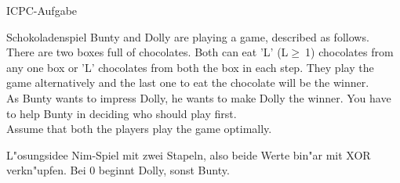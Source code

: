 \documentclass[18pt]{beamer}
\begin{document}
\begin{frame}{ICPC-Aufgabe}
\begin{exampleblock}{Schokoladenspiel}
Bunty and Dolly are playing a game, described as follows.\\
There are two boxes full of chocolates. Both can eat 'L' (L$\geq\ $1) chocolates from any one box or 'L' chocolates from both the box in each step. They play the game alternatively and the last one to eat the chocolate will be the winner.\\
As Bunty wants to impress Dolly, he wants to make Dolly the winner. You have to help Bunty in deciding who should play first.\\
Assume that both the players play the game optimally.
\end{exampleblock}
\pause
\begin{block}{L"osungsidee}
Nim-Spiel mit zwei Stapeln, also beide Werte bin"ar mit XOR verkn"upfen.
Bei 0 beginnt Dolly, sonst Bunty.
\end{block}
\end{frame}
\end{document}
